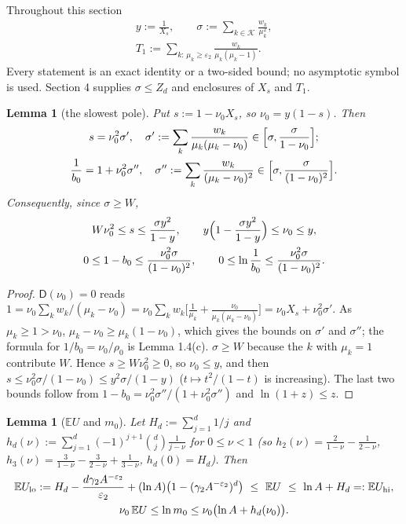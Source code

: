 \documentclass[11pt,a4paper]{article}
\newtheorem{lemma}[theorem]{Lemma}
\theoremstyle{definition}
\theoremstyle{remark}
\begin{document}
Throughout this section
\begin{gather*}
y:=\frac1{X_s}, \qquad \sigma:=\sum_{k\in\mathcal K}\frac{w_k}{\mu_k^2}, \\
T_1:=\sum_{k:\,\mu_k\ge\varepsilon_2}\frac{w_k}{\mu_k(\mu_k-1)} .
\end{gather*}
Every statement is an exact identity or a two-sided bound; no asymptotic symbol is used. Section 4 supplies $\sigma\le Z_d$ and enclosures of $X_s$ and $T_1$.

\begin{lemma}[{the slowest pole}]
Put $s:=1-\nu_0X_s$, so $\nu_0=y(1-s)$. Then
\begin{gather*}
s=\nu_0^2\sigma',\quad \sigma':=\sum_k\frac{w_k}{\mu_k(\mu_k-\nu_0)}\in\Bigl[\sigma,\frac{\sigma}{1-\nu_0}\Bigr]; \\
\frac1{b_0}=1+\nu_0^2\sigma'',\quad \sigma'':=\sum_k\frac{w_k}{(\mu_k-\nu_0)^2}\in\Bigl[\sigma,\frac{\sigma}{(1-\nu_0)^2}\Bigr].
\end{gather*}
Consequently, since $\sigma\ge W$,
\begin{gather*}
W\nu_0^2\le s\le\frac{\sigma y^2}{1-y}, \qquad y\Bigl(1-\frac{\sigma y^2}{1-y}\Bigr)\le\nu_0\le y, \\
0\le1-b_0\le\frac{\nu_0^2\sigma}{(1-\nu_0)^2}, \qquad 0\le\ln\frac1{b_0}\le\frac{\nu_0^2\sigma}{(1-\nu_0)^2}.
\end{gather*}
\end{lemma}

\begin{proof}
$\mathsf D(\nu_0)=0$ reads $1=\nu_0\sum_kw_k/(\mu_k-\nu_0)=\nu_0\sum_k w_k\bigl[\frac1{\mu_k}+\frac{\nu_0}{\mu_k(\mu_k-\nu_0)}\bigr]=\nu_0X_s+\nu_0^2\sigma'$. As $\mu_k\ge1>\nu_0$, $\mu_k-\nu_0\ge\mu_k(1-\nu_0)$, which gives the bounds on $\sigma'$ and $\sigma''$; the formula for $1/b_0=\nu_0/\rho_0$ is Lemma 1.4(c). $\sigma\ge W$ because the $k$ with $\mu_k=1$ contribute $W$. Hence $s\ge W\nu_0^2\ge0$, so $\nu_0\le y$, and then $s\le\nu_0^2\sigma/(1-\nu_0)\le y^2\sigma/(1-y)$ ($t\mapsto t^2/(1-t)$ is increasing). The last two bounds follow from $1-b_0=\nu_0^2\sigma''/(1+\nu_0^2\sigma'')$ and $\ln(1+z)\le z$.
\end{proof}

\begin{lemma}[{$\mathbb E U$ and $m_0$}]
Let $H_d:=\sum_{j=1}^d1/j$ and $h_d(\nu):=\sum_{j=1}^d(-1)^{j+1}\binom dj\frac{1}{j-\nu}$ for $0\le\nu<1$ (so $h_2(\nu)=\frac2{1-\nu}-\frac1{2-\nu}$, $h_3(\nu)=\frac3{1-\nu}-\frac3{2-\nu}+\frac1{3-\nu}$, $h_d(0)=H_d$). Then
\begin{gather*}
\mathbb EU_{\rm lo}:=H_d-\frac{d\gamma_2A^{-\varepsilon_2}}{\varepsilon_2}+(\ln A)\bigl(1-(\gamma_2A^{-\varepsilon_2})^d\bigr)\ \le\ \mathbb EU\ \le\ \ln A+H_d=:\mathbb EU_{\rm hi}, \\
\nu_0\,\mathbb EU\le\ln m_0\le\nu_0\bigl(\ln A+h_d(\nu_0)\bigr).
\end{gather*}
\end{lemma}
\end{document}
